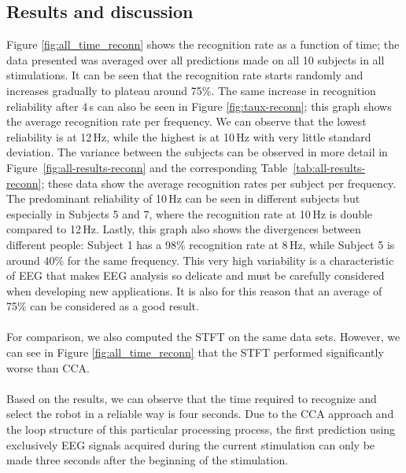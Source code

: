 \documentclass[smallextended]{svjour3}
\begin{document}
\subsection{Results and discussion}
Figure \ref{fig:all_time_reconn} shows the recognition rate as a function of time; the data presented was averaged over all predictions made on all 10 subjects in all stimulations.
It can be seen that the recognition rate starts randomly and increases gradually to plateau around 75\%.
The same increase in recognition reliability after 4\,s can also be seen in Figure \ref{fig:taux-reconn}; this graph shows the average recognition rate per frequency.
We can observe that the lowest reliability is at 12\,Hz, while the highest is at 10\,Hz with very little standard deviation.
The variance between the subjects can be observed in more detail in Figure~\ref{fig:all-results-reconn} and the corresponding Table~\ref{tab:all-results-reconn}; these data show the average recognition rates per subject per frequency.
The predominant reliability of 10\,Hz can be seen in different subjects but especially in Subjects 5 and 7, where the recognition rate at 10\,Hz is double compared to 12\,Hz.
Lastly, this graph also shows the divergences between different people: Subject 1 has a 98\% recognition rate at 8\,Hz, while Subject 5 is around 40\% for the same frequency.
This very high variability is a characteristic of EEG that makes EEG analysis so delicate and must be carefully considered when developing new applications. It is also for this reason that an average of 75\% can be considered as a good result.\\
\\
For comparison, we also computed the STFT on the same data sets.
However, we can see in Figure \ref{fig:all_time_reconn} that the STFT performed significantly worse than CCA.\\
\\
Based on the results, we can observe that the time required to recognize and select the robot in a reliable way is four seconds. 
Due to the CCA approach and the loop structure of this particular processing process, the first prediction using exclusively EEG signals acquired during the current stimulation can only be made three seconds after the beginning of the stimulation.
\end{document}
